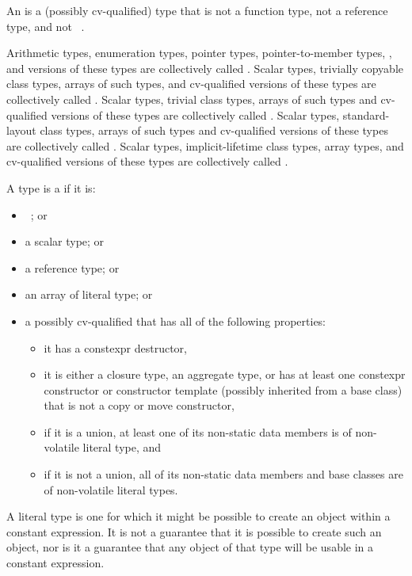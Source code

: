 \pnum
An  is a (possibly cv-qualified) type that is not
a function type, not a reference type, and not \cv{}~.

\pnum
{}%
%
%
Arithmetic types, enumeration types,
pointer types, pointer-to-member types,
,
and
 versions of these
types are collectively called
.
Scalar types, trivially copyable class types,
arrays of such types, and cv-qualified versions of these
types are collectively called .
Scalar types, trivial class types,
arrays of such types and cv-qualified versions of these
types are collectively called
. Scalar types, standard-layout class
types, arrays of such types and
cv-qualified versions of these types
are collectively called .
Scalar types, implicit-lifetime class types,
array types, and cv-qualified versions of these types
are collectively called .

\pnum
A type is a  if it is:
\begin{itemize}
\item \cv{}~; or
\item a scalar type; or
\item a reference type; or
\item an array of literal type; or
\item a possibly cv-qualified  that
has all of the following properties:
\begin{itemize}
\item it has a constexpr destructor,
\item it is either a closure type,
an aggregate type, or
has at least one constexpr constructor or constructor template
(possibly inherited from a base class)
that is not a copy or move constructor,
\item if it is a union, at least one of its non-static data members is
of non-volatile literal type, and
\item if it is not a union, all of its non-static data members and base classes are
of non-volatile literal types.
\end{itemize}
\end{itemize}
\begin{note}
A literal type is one for which
it might be possible to create an object
within a constant expression.
It is not a guarantee that it is possible to create such an object,
nor is it a guarantee that any object of that type
will be usable in a constant expression.
\end{note}

